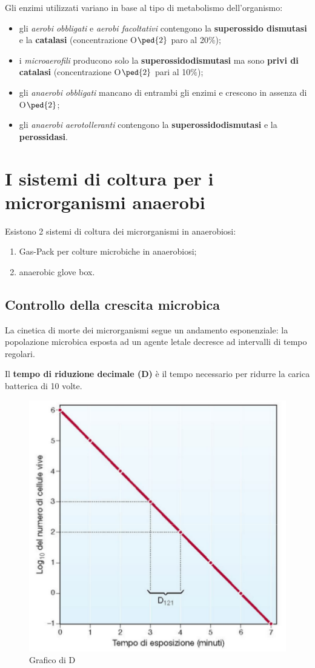 \documentclass[11pt]{book}
\begin{document}
Gli enzimi utilizzati variano in base al tipo di metabolismo dell'organismo:
\begin{itemize}
\item gli \emph{aerobi obbligati} e \emph{aerobi facoltativi} contengono la \textbf{superossido dismutasi} e la \textbf{catalasi} (concentrazione O$\ped{2}$ paro al 20$\%$);
\item i \emph{microaerofili} producono solo la \textbf{superossidodismutasi} ma sono \textbf{privi di catalasi} (concentrazione O$\ped{2}$ pari al 10$\%$);
\item gli \emph{anaerobi obbligati} mancano di entrambi gli enzimi e crescono in assenza di O$\ped{2}$;
\item gli \emph{anaerobi aerotolleranti} contengono la \textbf{superossidodismutasi} e la \textbf{perossidasi}.
\end{itemize}


\section{I sistemi di coltura per i microrganismi anaerobi}
Esistono 2 sistemi di coltura dei microrganismi in anaerobiosi:
\begin{enumerate}
\item Gas-Pack per colture microbiche in anaerobiosi;
\item anaerobic glove box.
\end{enumerate}

\subsection{Controllo della crescita microbica}
La cinetica di morte dei microrganismi segue un andamento esponenziale: la popolazione microbica esposta ad un agente letale decresce ad intervalli di tempo regolari. 

Il \textbf{tempo di riduzione decimale (D)} è il tempo necessario per ridurre la carica batterica di 10 volte.

\begin{figure}[htp]
\centering
\includegraphics[scale=0.5]{img/Tempo di riduzione decimale.png}
\caption{Grafico di D}
\label{}
\end{figure}
\end{document}
